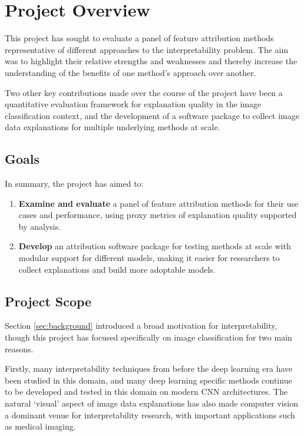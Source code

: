 \documentclass[main]{subfiles}
\begin{document}

\section{Project Overview}
This project has sought to evaluate a panel of feature attribution methods representative of different approaches to the interpretability problem. The aim was to highlight their relative strengths and weaknesses and thereby increase the understanding of the benefits of one method's approach over another.

Two other  key contributions made over the course of the project have been a quantitative evaluation framework for explanation quality in the image classification context, and the development of a software package to collect image data explanations for multiple underlying methods at scale.

\subsection*{Goals}
In summary, the project has aimed to:
\begin{enumerate}
	\item \textbf{Examine and evaluate} a panel of feature attribution methods for their use cases and performance, using proxy metrics of explanation quality supported by analysis.

	\item \textbf{Develop} an attribution software package for testing methods at scale with modular support for different models, making it easier for researchers to collect explanations and build more adoptable models.
	
\end{enumerate}


\newpage

\subsection*{Project Scope} \label{sec:intro_scope}

Section \ref{sec:background} introduced a broad motivation for interpretability, though this project has focused specifically on image classification for two main reasons.

Firstly, many interpretability techniques from before the deep learning era have been studied in this domain, and many deep learning specific methods continue to be developed and tested in this domain on modern CNN architectures. The natural `visual' aspect of  image data explanations has also made computer vision a dominant venue for interpretability research, with important applications such as medical imaging.
 
\end{document}

